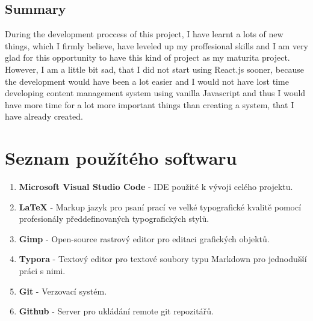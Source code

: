 \documentclass[12pt,a4paper]{report}
\begin{document}
  \section*{Summary}
  During the development proccess of this project, I have learnt a lots of new things,
  which I firmly believe, have leveled up my proffesional skills  and I am very glad for this opportunity to have
  this kind of project as my maturita project. However, I am a little bit sad, that I did not start
  using React.js sooner, because the development would have been a lot easier and I would not have lost time 
  developing content management system using vanilla Javascript and thus I would have more time for a lot more important 
  things than creating a system, that I have already created.

  \chapter{Seznam použítého softwaru}
    \begin{enumerate}
      \item \textbf{Microsoft Visual Studio Code} - IDE použité k vývoji celého projektu.   
      \item \textbf{LaTeX} - Markup jazyk pro psaní prací ve velké typografické kvalitě pomocí profesionály předdefinovaných typografických stylů.
      \item \textbf{Gimp} - Open-source rastrový editor pro editaci grafických objektů.
      \item \textbf{Typora} - Textový editor pro textové soubory typu Markdown pro jednodušší práci s nimi. 
      \item \textbf{Git} - Verzovací systém.
      \item \textbf{Github} - Server pro ukládání remote git repozitářů.
    \end{enumerate}
\end{document}
